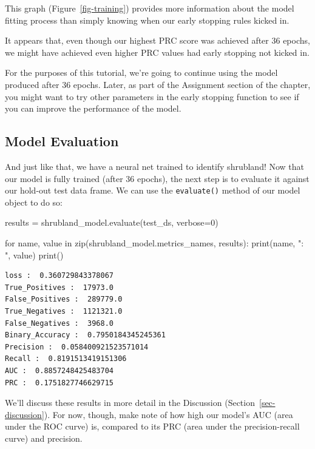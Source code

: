 \documentclass[
  letterpaper,
  DIV=11,
  numbers=noendperiod]{scrartcl}
\newenvironment{Shaded}{\begin{snugshade}}{\end{snugshade}}
\newcommand{\BuiltInTok}[1]{\textcolor[rgb]{0.00,0.23,0.31}{#1}}
\newcommand{\ControlFlowTok}[1]{\textcolor[rgb]{0.00,0.23,0.31}{#1}}
\newcommand{\DecValTok}[1]{\textcolor[rgb]{0.68,0.00,0.00}{#1}}
\newcommand{\KeywordTok}[1]{\textcolor[rgb]{0.00,0.23,0.31}{#1}}
\newcommand{\NormalTok}[1]{\textcolor[rgb]{0.00,0.23,0.31}{#1}}
\newcommand{\OperatorTok}[1]{\textcolor[rgb]{0.37,0.37,0.37}{#1}}
\newcommand{\StringTok}[1]{\textcolor[rgb]{0.13,0.47,0.30}{#1}}
\begin{document}
This graph (Figure~\ref{fig-training}) provides more information about
the model fitting process than simply knowing when our early stopping
rules kicked in.

It appears that, even though our highest PRC score was achieved after 36
epochs, we might have achieved even higher PRC values had early stopping
not kicked in.

For the purposes of this tutorial, we're going to continue using the
model produced after 36 epochs. Later, as part of the Assignment section
of the chapter, you might want to try other parameters in the early
stopping function to see if you can improve the performance of the
model.

\hypertarget{model-evaluation}{%
\subsection{Model Evaluation}\label{model-evaluation}}

And just like that, we have a neural net trained to identify shrubland!
Now that our model is fully trained (after 36 epochs), the next step is
to evaluate it against our hold-out test data frame. We can use the
\texttt{evaluate()} method of our model object to do so:

\begin{Shaded}
\begin{Highlighting}[]
\NormalTok{results }\OperatorTok{=}\NormalTok{ shrubland\_model.evaluate(test\_ds, verbose}\OperatorTok{=}\DecValTok{0}\NormalTok{)}

\ControlFlowTok{for}\NormalTok{ name, value }\KeywordTok{in} \BuiltInTok{zip}\NormalTok{(shrubland\_model.metrics\_names, results):}
    \BuiltInTok{print}\NormalTok{(name, }\StringTok{": "}\NormalTok{, value)}
\BuiltInTok{print}\NormalTok{()}
\end{Highlighting}
\end{Shaded}

\begin{verbatim}
loss :  0.360729843378067
True_Positives :  17973.0
False_Positives :  289779.0
True_Negatives :  1121321.0
False_Negatives :  3968.0
Binary_Accuracy :  0.7950184345245361
Precision :  0.058400921523571014
Recall :  0.8191513419151306
AUC :  0.8857248425483704
PRC :  0.1751827746629715
\end{verbatim}

We'll discuss these results in more detail in the Discussion
(Section~\ref{sec-discussion}). For now, though, make note of how high
our model's AUC (area under the ROC curve) is, compared to its PRC (area
under the precision-recall curve) and precision.
\end{document}
